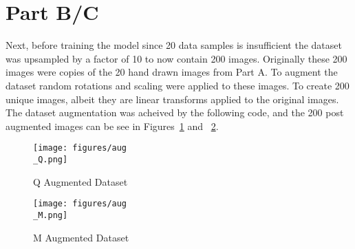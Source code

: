 \newpage
\section{Part B/C}
\label{sec:sec_b}
Next, before training the model since 20 data samples is insufficient the dataset was upsampled by a factor of 10 to now contain 200 images. Originally these 200 images were copies of the 20 hand drawn images from Part A. To augment the dataset random rotations and scaling were applied to these images. To create 200 unique images, albeit they are linear transforms applied to the original images. The dataset augmentation was acheived by the following code, and the 200 post augmented images can be see in Figures~\ref{fig:aug Q} and ~\ref{fig:aug M}.


\begin{figure}[htpb]
	\centering
	\texttt{[image: figures/aug\\\_Q.png]}
	\caption{Q Augmented Dataset}
	\label{fig:aug Q}
\end{figure}

\begin{figure}[htpb]
	\centering
	\texttt{[image: figures/aug\\\_M.png]}
	\caption{M Augmented Dataset}
	\label{fig:aug M}
\end{figure}
